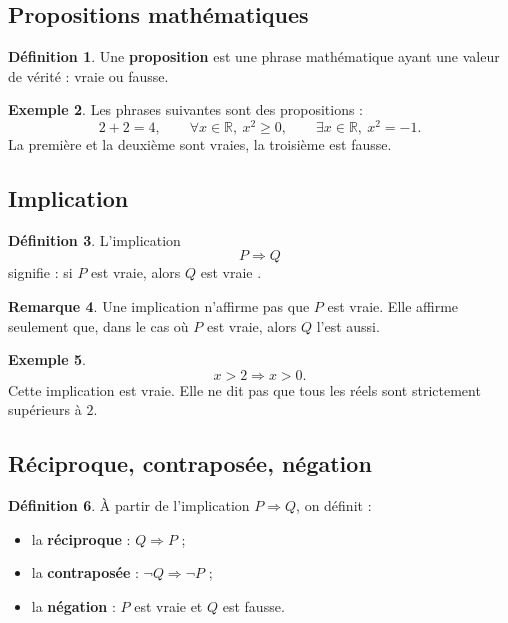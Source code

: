 \documentclass[11pt,a4paper]{article}
\theoremstyle{definition}
\newtheorem{definition}{Définition}[section]
\newtheorem{exemple}[definition]{Exemple}
\newtheorem{remarque}[definition]{Remarque}
\theoremstyle{plain}
\newcommand{\R}{\mathbb{R}}
\begin{document}
\subsection{Propositions mathématiques}

\begin{definition}
Une \textbf{proposition} est une phrase mathématique ayant une valeur de vérité : vraie ou fausse.
\end{definition}

\begin{exemple}
Les phrases suivantes sont des propositions :
\[
2+2=4,
\qquad
\forall x\in\R,\ x^2\geq 0,
\qquad
\exists x\in\R,\ x^2=-1.
\]
La première et la deuxième sont vraies, la troisième est fausse.
\end{exemple}

\subsection{Implication}

\begin{definition}
L'implication
\[
P \Rightarrow Q
\]
signifie : \og si $P$ est vraie, alors $Q$ est vraie \fg.
\end{definition}

\begin{remarque}
Une implication n'affirme pas que $P$ est vraie. Elle affirme seulement que, dans le cas où $P$ est vraie, alors $Q$ l'est aussi.
\end{remarque}

\begin{exemple}
\[
x>2 \Rightarrow x>0.
\]
Cette implication est vraie. Elle ne dit pas que tous les réels sont strictement supérieurs à $2$.
\end{exemple}

\subsection{Réciproque, contraposée, négation}

\begin{definition}
À partir de l'implication $P\Rightarrow Q$, on définit :
\begin{itemize}
    \item la \textbf{réciproque} : $Q\Rightarrow P$ ;
    \item la \textbf{contraposée} : $\neg Q\Rightarrow \neg P$ ;
    \item la \textbf{négation} : $P$ est vraie et $Q$ est fausse.
\end{itemize}
\end{definition}
\end{document}
